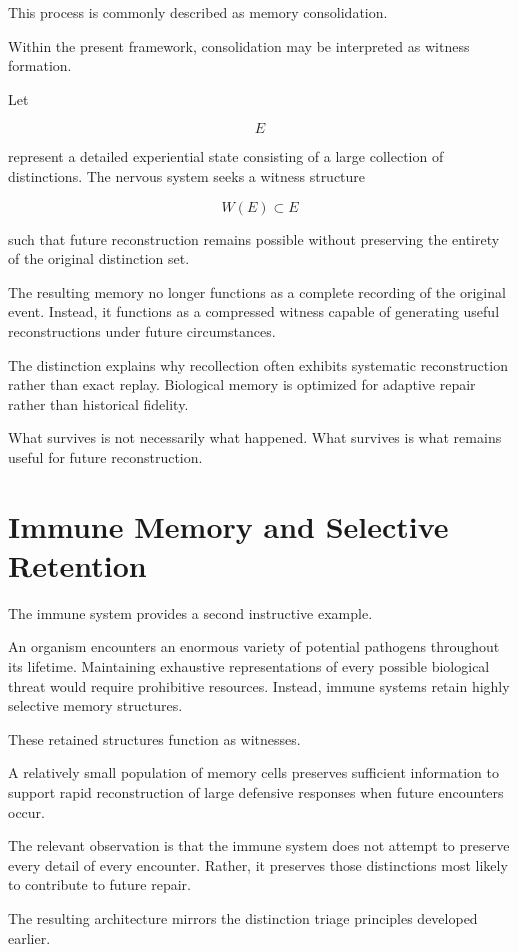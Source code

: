 \documentclass[12pt,oneside]{book}
\theoremstyle{plain} \newtheorem{theorem}{Theorem}[chapter] \newtheorem{lemma}[theorem]{Lemma} \newtheorem{proposition}[theorem]{Proposition} \newtheorem{corollary}[theorem]{Corollary}
\theoremstyle{definition} \newtheorem{definition}[theorem]{Definition} \newtheorem{axiom}[theorem]{Axiom} \newtheorem{construction}[theorem]{Construction}
\theoremstyle{remark} \newtheorem{remark}[theorem]{Remark} \newtheorem{example}[theorem]{Example}
\begin{document}
This process is commonly described as memory consolidation.

Within the present framework, consolidation may be interpreted as witness formation.

Let

\[
E
\]

represent a detailed experiential state consisting of a large collection of distinctions. The nervous system seeks a witness structure

\[
W(E)
\subset E
\]

such that future reconstruction remains possible without preserving the entirety of the original distinction set.

The resulting memory no longer functions as a complete recording of the original event. Instead, it functions as a compressed witness capable of generating useful reconstructions under future circumstances.

The distinction explains why recollection often exhibits systematic reconstruction rather than exact replay. Biological memory is optimized for adaptive repair rather than historical fidelity.

What survives is not necessarily what happened. What survives is what remains useful for future reconstruction.

\section{Immune Memory and Selective Retention}

The immune system provides a second instructive example.

An organism encounters an enormous variety of potential pathogens throughout its lifetime. Maintaining exhaustive representations of every possible biological threat would require prohibitive resources. Instead, immune systems retain highly selective memory structures.

These retained structures function as witnesses.

A relatively small population of memory cells preserves sufficient information to support rapid reconstruction of large defensive responses when future encounters occur.

The relevant observation is that the immune system does not attempt to preserve every detail of every encounter. Rather, it preserves those distinctions most likely to contribute to future repair.

The resulting architecture mirrors the distinction triage principles developed earlier.
\end{document}

